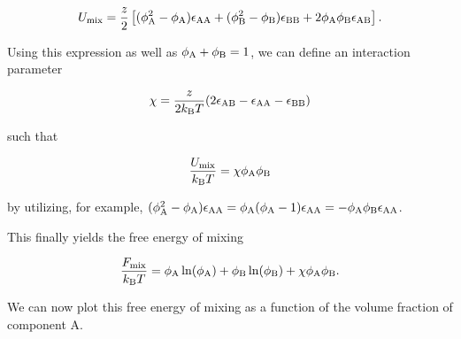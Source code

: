 \documentclass[letterpaper,10pt,english]{sphinxmanual}
\begin{document}
\sphinxAtStartPar
\begin{equation}
U_{\rm mix}=\frac{z}{2}\left [(\phi_{\rm A}^2-\phi_{\rm A})\epsilon_{\rm AA}+(\phi_{\rm B}^2-\phi_{\rm B})\epsilon_{\rm BB}+2\phi_{\rm A}\phi_{\rm B}\epsilon_{\rm AB}\right].
\end{equation}

\sphinxAtStartPar
Using this expression as well as \(\phi_{\rm A}+\phi_{\rm B}=1\), we can define an interaction parameter

\sphinxAtStartPar
\begin{equation}
\chi=\frac{z}{2k_{\rm B}T}(2\epsilon_{\rm AB}-\epsilon_{\rm AA}-\epsilon_{\rm BB})
\end{equation}

\sphinxAtStartPar
such that

\sphinxAtStartPar
\begin{equation}
\frac{U_{\rm mix}}{k_{\rm B}T}=\chi\phi_{\rm A}\phi_{\rm B}
\end{equation}

\sphinxAtStartPar
by utilizing, for example, \((\phi_{\rm A}^2-\phi_{\rm A})\epsilon_{\rm AA}=\phi_{\rm A}(\phi_{\rm A}-1)\epsilon_{\rm AA}=-\phi_{\rm A}\phi_{\rm B}\epsilon_{\rm AA}\).

\sphinxAtStartPar
This finally yields the free energy of mixing

\sphinxAtStartPar
\begin{equation}
\frac{F_{\rm mix}}{k_{\rm B}T}=\phi_{\rm A}\ln(\phi_{\rm A})+\phi_{\rm B}\ln(\phi_{\rm B})+\chi\phi_{\rm A}\phi_{\rm B}.
\end{equation}

\sphinxAtStartPar
We can now plot this free energy of mixing as a function of the volume fraction of component A.
\end{document}

